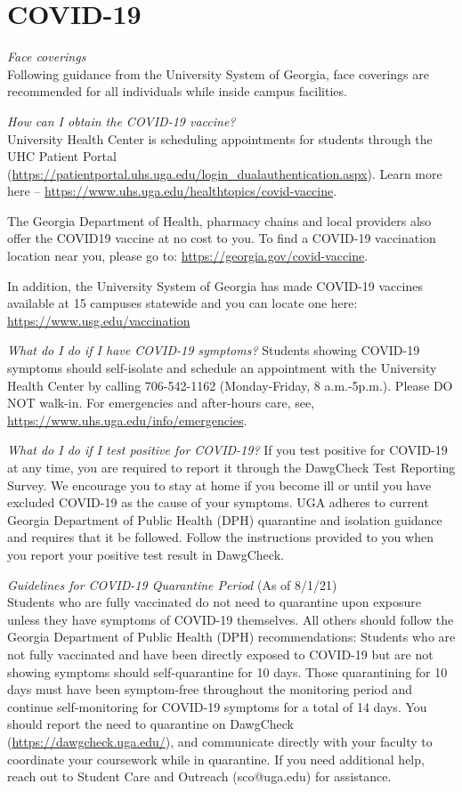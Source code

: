 \documentclass[12pt]{article}
\begin{document}
\vspace{-2mm}
\section*{\normalsize COVID-19}
\vspace{-4mm}

{\it Face coverings \\}
Following guidance from the University System of Georgia, face
coverings are recommended for all individuals while inside campus
facilities. 

{\it How can I obtain the COVID-19 vaccine? \\}
University Health Center is scheduling appointments for students
through the UHC Patient Portal
(\url{https://patientportal.uhs.uga.edu/login\_dualauthentication.aspx}). Learn
more here – \url{https://www.uhs.uga.edu/healthtopics/covid-vaccine}. 

The Georgia Department of Health, pharmacy chains and local providers
also offer the COVID19 vaccine at no cost to you. To find a COVID-19
vaccination location near you, please go to:
\url{https://georgia.gov/covid-vaccine}. 

In addition, the University System of Georgia has made COVID-19
vaccines available at 15 campuses statewide and you can locate one
here: \url{https://www.usg.edu/vaccination}

{\it What do I do if I have COVID-19 symptoms?}
Students showing COVID-19 symptoms should self-isolate and schedule an
appointment with the University Health Center by calling 706-542-1162
(Monday-Friday, 8 a.m.-5p.m.). Please DO NOT walk-in. For emergencies
and after-hours care, see, \url{https://www.uhs.uga.edu/info/emergencies}.

{\it What do I do if I test positive for COVID-19?}
If you test positive for COVID-19 at any time, you are required to
report it through the DawgCheck Test Reporting Survey. We encourage
you to stay at home if you become ill or until you have excluded
COVID-19 as the cause of your symptoms. UGA adheres to current Georgia
Department of Public Health (DPH) quarantine and isolation guidance
and requires that it be followed. Follow the instructions provided to
you when you report your positive test result in DawgCheck.

{\it Guidelines for COVID-19 Quarantine Period} (As of 8/1/21) \\
Students who are fully vaccinated do not need to quarantine upon
exposure unless they have symptoms of COVID-19 themselves. All others
should follow the Georgia Department of Public Health (DPH)
recommendations: Students who are not fully vaccinated and have been
directly exposed to COVID-19 but are not showing symptoms should
self-quarantine for 10 days. Those quarantining for 10 days must have
been symptom-free throughout the monitoring period and continue
self-monitoring for COVID-19 symptoms for a total of 14 days. You
should report the need to quarantine on DawgCheck
(\url{https://dawgcheck.uga.edu/}), and communicate directly with your
faculty to coordinate your coursework while in quarantine. If you need
additional help, reach out to Student Care and Outreach (sco@uga.edu)
for assistance. 
\end{document}
